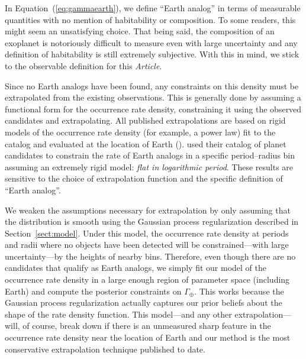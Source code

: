 \documentclass[12pt,preprint]{aastex}
\newcommand{\paper}{\textsl{Article}}
\newcommand{\Eq}[1]{Equation~(\ref{eq:#1})}
\newcommand{\eq}[1]{\Eq{#1}}
\newcommand{\Sect}[1]{Section~\ref{sect:#1}}
\newcommand{\sect}[1]{\Sect{#1}}
\newcommand{\rate}{\ensuremath{\Gamma}}
\newcommand{\gammaearth}{{\ensuremath{\rate_\oplus}}}
\begin{document}
In \eq{gammaearth}, we define ``Earth analog'' in terms of measurable
quantities with no mention of habitability or composition.
To some readers, this might seem an unsatisfying choice.
That being said, the composition of an exoplanet is notoriously difficult to
measure even with large uncertainty and any definition of habitability is
still extremely subjective.
With this in mind, we stick to the observable definition for this \paper.

Since no Earth analogs have been found, any constraints on this density must
be extrapolated from the existing observations.
This is generally done by assuming a functional form for the occurrence rate
density, constraining it using the observed candidates and extrapolating.
All published extrapolations are based on rigid models of the occurrence rate
density (for example, a power law) fit to the catalog and evaluated at the
location of Earth (\citealt{catanzarite, traub}).
\citet{petigura} used their catalog of planet candidates to constrain the rate
of Earth analogs in a specific period--radius bin assuming an extremely rigid
model: \emph{flat in logarithmic period}.
These results are sensitive to the choice of extrapolation function and the
specific definition of ``Earth analog''.

We weaken the assumptions necessary for extrapolation by only assuming that
the distribution is smooth using the Gaussian process regularization described
in \sect{model}.
Under this model, the occurrence rate density at periods and radii where no
objects have been detected will be constrained---with large uncertainty---by
the heights of nearby bins.
Therefore, even though there are no candidates that qualify as Earth analogs,
we simply fit our model of the occurrence rate density in a large enough
region of parameter space (including Earth) and compute the posterior
constraints on \gammaearth.
This works because the Gaussian process regularization actually captures our
prior beliefs about the shape of the rate density function.
This model---and any other extrapolation---will, of course, break down if
there is an unmeasured sharp feature in the occurrence rate density near the
location of Earth and our method is the most conservative extrapolation
technique published to date.
\end{document}
